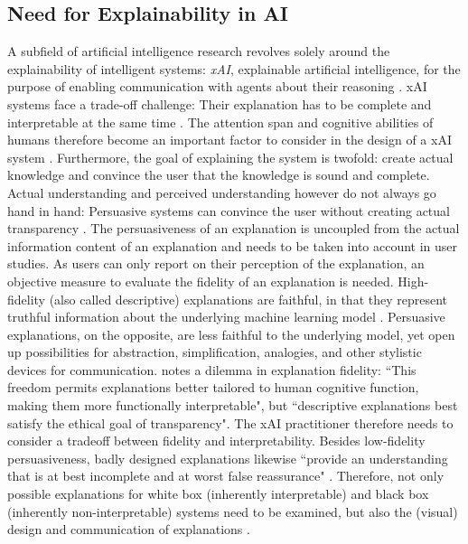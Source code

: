 \subsection{Need for Explainability in AI}
\label{subsec:explainability}
A subfield of artificial intelligence research revolves solely around the explainability of intelligent systems: \textit{xAI}, explainable artificial intelligence, for the purpose of enabling communication with agents about their reasoning \cite{hendricks2018generating}. xAI systems face a trade-off challenge: Their explanation has to be complete and interpretable at the same time \cite{gilpin2018explaining}. The attention span and cognitive abilities of humans therefore become an important factor to consider in the design of a xAI system \cite{kulesza2013too}. Furthermore, the goal of explaining the system is twofold: create actual knowledge and convince the user that the knowledge is sound and complete. Actual understanding and perceived understanding however do not always go hand in hand: Persuasive systems can convince the user without creating actual transparency \cite{gilpin2018explaining}. The persuasiveness of an explanation is uncoupled from the actual information content of an explanation \cite{biran2017explanation} and needs to be taken into account in user studies. As users can only report on their perception of the explanation, an objective measure to evaluate the fidelity of an explanation is needed. High-fidelity (also called descriptive) explanations are faithful, in that they represent truthful information about the underlying machine learning model \cite{herman2017promise}. Persuasive explanations, on the opposite, are less faithful to the underlying model, yet open up possibilities for abstraction, simplification, analogies, and other stylistic devices for communication. \cite{herman2017promise} notes a dilemma in explanation fidelity: ``This freedom permits explanations better tailored to human cognitive function, making them more functionally interpretable", but ``descriptive explanations best satisfy the ethical goal of transparency". The xAI practitioner therefore needs to consider a tradeoff between fidelity and interpretability. \newline 
Besides low-fidelity persuasiveness, badly designed explanations likewise ``provide an understanding that is at best incomplete and at worst false reassurance" \cite{burrell2016machine}. Therefore, not only possible explanations for white box (inherently interpretable) and black box (inherently non-interpretable) systems need to be examined, but also the (visual) design and communication of explanations \cite{guidotti2018survey}. \newline
